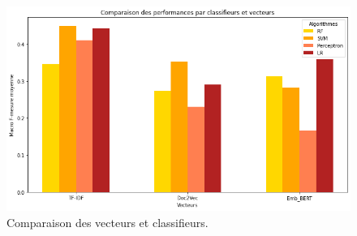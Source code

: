 \begin{figure}[t]
  \includegraphics[width=\columnwidth]{"./assets/comparaison_vecteur_clf_barplot.png"}
  \caption{Comparaison des vecteurs et classifieurs.}
  \label{fig:comparaison_vecteur}
\end{figure}